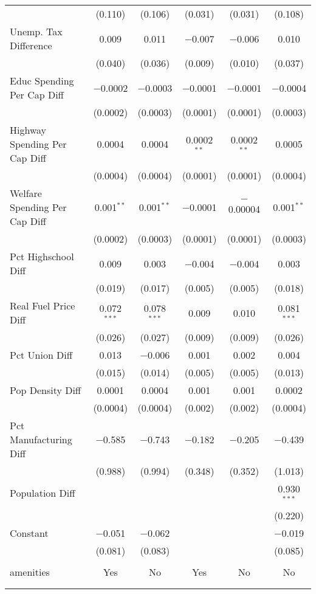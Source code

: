 \begin{table}[!htbp]
\begin{tabular}{@{\extracolsep{5pt}}lccccc}
  & (0.110) & (0.106) & (0.031) & (0.031) & (0.108) \\ 
  Unemp. Tax Difference & 0.009 & 0.011 & $-$0.007 & $-$0.006 & 0.010 \\ 
  & (0.040) & (0.036) & (0.009) & (0.010) & (0.037) \\ 
  Educ Spending Per Cap Diff & $-$0.0002 & $-$0.0003 & $-$0.0001 & $-$0.0001 & $-$0.0004 \\ 
  & (0.0002) & (0.0003) & (0.0001) & (0.0001) & (0.0003) \\ 
  Highway Spending Per Cap Diff & 0.0004 & 0.0004 & 0.0002$^{**}$ & 0.0002$^{**}$ & 0.0005 \\ 
  & (0.0004) & (0.0004) & (0.0001) & (0.0001) & (0.0004) \\ 
  Welfare Spending Per Cap Diff & 0.001$^{**}$ & 0.001$^{**}$ & $-$0.0001 & $-$0.00004 & 0.001$^{**}$ \\ 
  & (0.0002) & (0.0003) & (0.0001) & (0.0001) & (0.0003) \\ 
  Pct Highschool Diff & 0.009 & 0.003 & $-$0.004 & $-$0.004 & 0.003 \\ 
  & (0.019) & (0.017) & (0.005) & (0.005) & (0.018) \\ 
  Real Fuel Price Diff & 0.072$^{***}$ & 0.078$^{***}$ & 0.009 & 0.010 & 0.081$^{***}$ \\ 
  & (0.026) & (0.027) & (0.009) & (0.009) & (0.026) \\ 
  Pct Union Diff & 0.013 & $-$0.006 & 0.001 & 0.002 & 0.004 \\ 
  & (0.015) & (0.014) & (0.005) & (0.005) & (0.013) \\ 
  Pop Density Diff & 0.0001 & 0.0004 & 0.001 & 0.001 & 0.0002 \\ 
  & (0.0004) & (0.0004) & (0.002) & (0.002) & (0.0004) \\ 
  Pct Manufacturing Diff & $-$0.585 & $-$0.743 & $-$0.182 & $-$0.205 & $-$0.439 \\ 
  & (0.988) & (0.994) & (0.348) & (0.352) & (1.013) \\ 
  Population Diff &  &  &  &  & 0.930$^{***}$ \\ 
  &  &  &  &  & (0.220) \\ 
  Constant & $-$0.051 & $-$0.062 &  &  & $-$0.019 \\ 
  & (0.081) & (0.083) &  &  & (0.085) \\ 
 \hline \\[-1.8ex] 
amenities & Yes & No & Yes & No & No \\ 
\hline \\[-1.8ex] 
\hline 
\hline \\[-1.8ex] 
\end{tabular} 
\end{table} 
